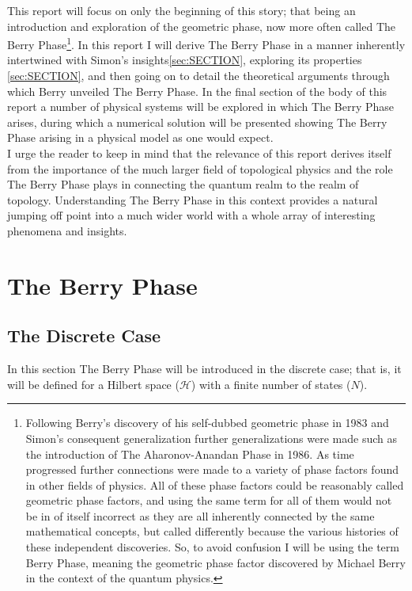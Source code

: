 \documentclass{article}
\begin{document}
This report will focus on only the beginning of this story; that being an introduction and exploration of the geometric phase, now more often called The Berry Phase\footnote{Following Berry's discovery of his self-dubbed geometric phase in 1983 and Simon's consequent generalization further generalizations were made such as the introduction of The Aharonov-Anandan Phase in 1986. As time progressed further connections were made to a variety of phase factors found in other fields of physics. All of these phase factors could be reasonably called geometric phase factors, and using the same term for all of them would not be in of itself incorrect as they are all inherently connected by the same mathematical concepts, but called differently because the various histories of these independent discoveries. So, to avoid confusion I will be using the term Berry Phase, meaning the geometric phase factor discovered by Michael Berry in the context of the quantum physics.}.  In this report I will derive The Berry Phase in a manner inherently intertwined with Simon's insights\ref{sec:SECTION}, exploring its properties \ref{sec:SECTION}, and then going on to detail the theoretical arguments through which Berry unveiled The Berry Phase. In the final section of the body of this report a number of physical systems will be explored in which The Berry Phase arises, during which a numerical solution will be presented showing The Berry Phase arising in a physical model as one would expect.\\

I urge the reader to keep in mind that the relevance of this report derives itself from the importance of the much larger field of topological physics and the role The Berry Phase plays in connecting the quantum realm to the realm of topology. Understanding The Berry Phase in this context provides a natural jumping off point into a much wider world with a whole array of interesting phenomena and insights.

\section{The Berry Phase\label{sec:the_berry_phase}}

\subsection{The Discrete Case \label{ssec:discrete_case}}

In this section The Berry Phase will be introduced in the discrete case; that is, it will be defined for a Hilbert space ($\mathcal{H}$) with a finite number of states ($N$). \\ 
\end{document}
